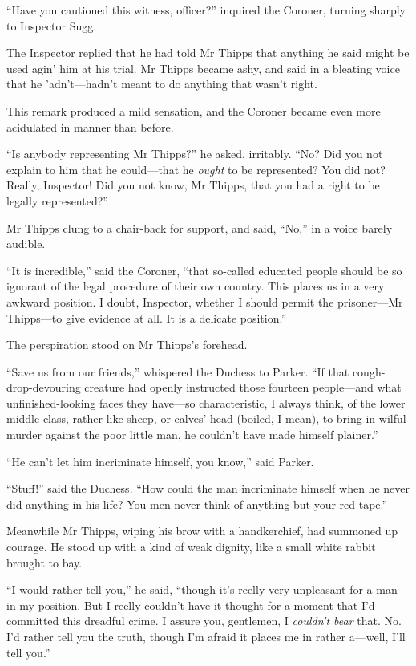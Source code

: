\enquote{Have you cautioned this witness, officer?} inquired the Coroner, turning sharply to Inspector Sugg.

The Inspector replied that he had told Mr Thipps that anything he said might be used agin’ him at his trial. Mr Thipps became ashy, and said in a bleating voice that he ’adn’t\allowbreak---\allowbreak hadn’t meant to do anything that wasn’t right.

This remark produced a mild sensation, and the Coroner became even more acidulated in manner than before.

\enquote{Is anybody representing Mr Thipps?} he asked, irritably. \enquote{No? Did you not explain to him that he could\allowbreak---\allowbreak that he \textit{ought} to be represented? You did not? Really, Inspector! Did you not know, Mr Thipps, that you had a right to be legally represented?}

Mr Thipps clung to a chair-back for support, and said, \enquote{No,} in a voice barely audible.

\enquote{It is incredible,} said the Coroner, \enquote{that so-called educated people should be so ignorant of the legal procedure of their own country. This places us in a very awkward position. I doubt, Inspector, whether I should permit the prisoner\allowbreak---\allowbreak Mr Thipps\allowbreak---\allowbreak to give evidence at all. It is a delicate position.}

The perspiration stood on Mr Thipps’s forehead.

\enquote{Save us from our friends,} whispered the Duchess to Parker. \enquote{If that cough-drop-devouring creature had openly instructed those fourteen people\allowbreak---\allowbreak and what unfinished-looking faces they have\allowbreak---\allowbreak so characteristic, I always think, of the lower middle-class, rather like sheep, or calves’ head (boiled, I mean), to bring in wilful murder against the poor little man, he couldn’t have made himself plainer.}

\enquote{He can’t let him incriminate himself, you know,} said Parker.

\enquote{Stuff!} said the Duchess. \enquote{How could the man incriminate himself when he never did anything in his life? You men never think of anything but your red tape.}

Meanwhile Mr Thipps, wiping his brow with a handkerchief, had summoned up courage. He stood up with a kind of weak dignity, like a small white rabbit brought to bay.

\enquote{I would rather tell you,} he said, \enquote{though it’s reelly very unpleasant for a man in my position. But I reelly couldn’t have it thought for a moment that I’d committed this dreadful crime. I assure you, gentlemen, I \textit{couldn’t bear} that. No. I’d rather tell you the truth, though I’m afraid it places me in rather a\allowbreak---\allowbreak well, I’ll tell you.}

